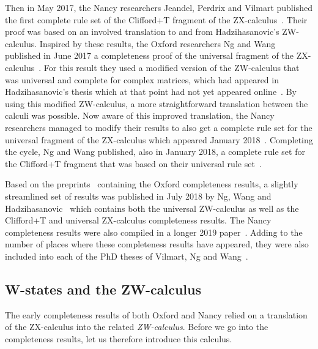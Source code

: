 \documentclass[a4paper,onecolumn,superscriptaddress,11pt,%
				unpublished,%
				allowfontchageintitle,%
				]{quantumarticle}
\begin{document}
Then in May 2017, the Nancy researchers Jeandel, Perdrix and Vilmart published the first complete rule set of the Clifford+T fragment of the ZX-calculus~\cite{SimonCompleteness}. 
Their proof was based on an involved translation to and from Hadzihasanovic's ZW-calculus.
Inspired by these results, the Oxford researchers Ng and Wang published in June 2017 a completeness proof of the universal fragment of the ZX-calculus~\cite{HarnyCompleteness}. For this result they used a modified version of the ZW-calculus that was universal and complete for complex matrices, which had appeared in Hadzihasanovic's thesis which at that point had not yet appeared online~\cite{hadzihasanovic2017algebra}. By using this modified ZW-calculus, a more straightforward translation between the calculi was possible.
Now aware of this improved translation, the Nancy researchers managed to modify their results to also get a complete rule set for the universal fragment of the ZX-calculus which appeared January 2018~\cite{JPV-universal}. Completing the cycle, Ng and Wang published, also in January 2018, a complete rule set for the Clifford+T fragment that was based on their universal rule set~\cite{ng_completeness_2018}.

Based on the preprints~\cite{HarnyCompleteness,ng_completeness_2018} containing the Oxford completeness results, a slightly streamlined set of results was published in July 2018 by Ng, Wang and Hadzihasanovic~\cite{HarnyAmarCompleteness} which contains both the universal ZW-calculus as well as the Clifford+T and universal ZX-calculus completeness results.
The Nancy completeness results were also compiled in a longer 2019 paper~\cite{jeandel2019completeness}. Adding to the number of places where these completeness results have appeared, they were also included into each of the PhD theses of Vilmart, Ng and Wang~\cite{vilmart2019thesis,wang_completeness_2018,ng2018thesis}.

\subsection{W-states and the ZW-calculus}\label{sec:ZW-calculus}

The early completeness results of both Oxford and Nancy relied on a translation of the ZX-calculus into the related \emph{ZW-calculus}.
Before we go into the completeness results, let us therefore introduce this calculus.
\end{document}
